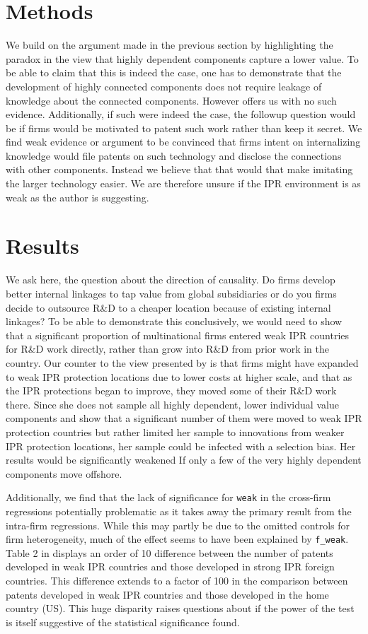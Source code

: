 \documentclass[12pt]{article}
\begin{document}
\section{Methods}
We build on the argument made in the previous section by highlighting the paradox in the view that highly dependent components capture a lower value. To be able to claim that this is indeed the case, one has to demonstrate that the development of highly connected components does not require leakage of knowledge about the connected components. However \cite{Zhao2006} offers us with no such evidence. Additionally, if such were indeed the case, the followup question would be if firms would be motivated to patent such work rather than keep it secret. We find weak evidence or argument to be convinced that firms intent on internalizing knowledge would file patents on such technology and disclose the connections with other components. Instead we believe that that would that make imitating the larger technology easier. We are therefore unsure if the IPR environment is as weak as the author is suggesting.

\section{Results}
We ask here, the question about the direction of causality. Do firms develop better internal linkages to tap value from global subsidiaries or do you firms decide to outsource R\&D to a cheaper location because of existing internal linkages? To be able to demonstrate this conclusively, we would need to show that a significant proportion of multinational firms entered weak IPR countries for R\&D work directly, rather than grow into R\&D from prior work in the country. Our counter to the view presented by \cite{Zhao2006} is that firms might have expanded to weak IPR protection locations due to lower costs at higher scale, and that as the IPR protections began to improve, they moved some of their R\&D work there. Since she does not sample all highly dependent, lower individual value components and show that a significant number of them were moved to weak IPR protection countries but rather limited her sample to innovations from weaker IPR protection locations, her sample could be infected with a selection bias. Her results would be significantly weakened If only a few of the very highly dependent components move offshore.

Additionally, we find that the lack of significance for \verb|weak| in the cross-firm regressions potentially problematic as it takes away the primary result from the intra-firm regressions. While this may partly be due to the omitted controls for firm heterogeneity, much of the effect seems to have been explained by \verb|f_weak|. Table 2 in \cite{Zhao2006} displays an order of 10 difference between the number of patents developed in weak IPR countries and those developed in strong IPR foreign countries. This difference extends to a factor of 100 in the comparison between patents developed in weak IPR countries and those developed in the home country (US). This huge disparity raises questions about if the power of the test is itself suggestive of the statistical significance found.
\end{document}
